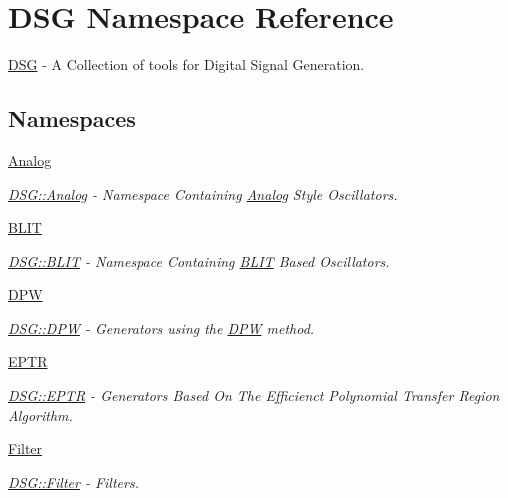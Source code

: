 \hypertarget{namespace_d_s_g}{\section{D\+S\+G Namespace Reference}
\label{namespace_d_s_g}
}


\hyperlink{namespace_d_s_g}{D\+S\+G} -\/ A Collection of tools for Digital Signal Generation.  


\subsection*{Namespaces}
\begin{DoxyCompactItemize}
\item 
 \hyperlink{namespace_d_s_g_1_1_analog}{Analog}
\begin{DoxyCompactList}\small\item\em \hyperlink{namespace_d_s_g_1_1_analog}{D\+S\+G\+::\+Analog} -\/ Namespace Containing \hyperlink{namespace_d_s_g_1_1_analog}{Analog} Style Oscillators. \end{DoxyCompactList}\item 
 \hyperlink{namespace_d_s_g_1_1_b_l_i_t}{B\+L\+I\+T}
\begin{DoxyCompactList}\small\item\em \hyperlink{namespace_d_s_g_1_1_b_l_i_t}{D\+S\+G\+::\+B\+L\+I\+T} -\/ Namespace Containing \hyperlink{namespace_d_s_g_1_1_b_l_i_t}{B\+L\+I\+T} Based Oscillators. \end{DoxyCompactList}\item 
 \hyperlink{namespace_d_s_g_1_1_d_p_w}{D\+P\+W}
\begin{DoxyCompactList}\small\item\em \hyperlink{namespace_d_s_g_1_1_d_p_w}{D\+S\+G\+::\+D\+P\+W} -\/ Generators using the \hyperlink{namespace_d_s_g_1_1_d_p_w}{D\+P\+W} method. \end{DoxyCompactList}\item 
 \hyperlink{namespace_d_s_g_1_1_e_p_t_r}{E\+P\+T\+R}
\begin{DoxyCompactList}\small\item\em \hyperlink{namespace_d_s_g_1_1_e_p_t_r}{D\+S\+G\+::\+E\+P\+T\+R} -\/ Generators Based On The Efficienct Polynomial Transfer Region Algorithm. \end{DoxyCompactList}\item 
 \hyperlink{namespace_d_s_g_1_1_filter}{Filter}
\begin{DoxyCompactList}\small\item\em \hyperlink{namespace_d_s_g_1_1_filter}{D\+S\+G\+::\+Filter} -\/ Filters. \end{DoxyCompactList}\item 

\end{DoxyCompactItemize}
